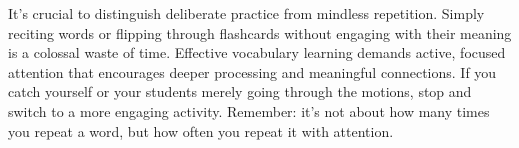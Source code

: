     
    


\begin{tcolorbox}[title=Warning: Mindless Repetition, colback=white, colframe=red!75!black, fonttitle=\bfseries]
It's crucial to distinguish deliberate practice from mindless repetition. Simply reciting words or flipping through flashcards without engaging with their meaning is a colossal waste of time. Effective vocabulary learning demands active, focused attention that encourages deeper processing and meaningful connections. If you catch yourself or your students merely going through the motions, stop and switch to a more engaging activity. Remember: it's not about how many times you repeat a word, but how often you repeat it with attention.
\end{tcolorbox}

